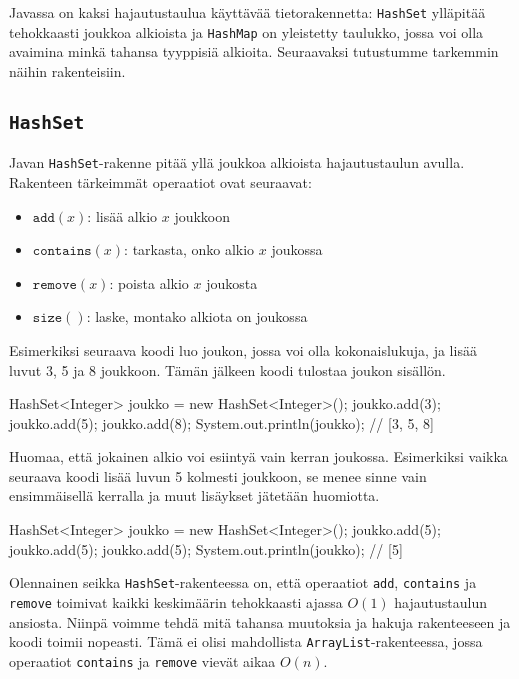 Javassa on kaksi hajautustaulua käyttävää tietorakennetta:
\texttt{HashSet} ylläpitää tehokkaasti joukkoa alkioista
ja \texttt{HashMap} on yleistetty taulukko,
jossa voi olla avaimina minkä tahansa tyyppisiä alkioita.
Seuraavaksi tutustumme tarkemmin näihin rakenteisiin.

\subsection{\texttt{HashSet}}

Javan \texttt{HashSet}-rakenne pitää yllä joukkoa alkioista
hajautustaulun avulla.
Rakenteen tärkeimmät operaatiot ovat seuraavat:

\begin{itemize}
\item $\texttt{add}(x)$: lisää alkio $x$ joukkoon
\item $\texttt{contains}(x)$: tarkasta, onko alkio $x$ joukossa
\item $\texttt{remove}(x)$: poista alkio $x$ joukosta
\item $\texttt{size}()$: laske, montako alkiota on joukossa
\end{itemize}

Esimerkiksi seuraava koodi luo joukon, jossa voi olla
kokonaislukuja, ja lisää luvut 3, 5 ja 8 joukkoon.
Tämän jälkeen koodi tulostaa joukon sisällön.

\begin{code}
HashSet<Integer> joukko = new HashSet<Integer>();
joukko.add(3);
joukko.add(5);
joukko.add(8);
System.out.println(joukko); // [3, 5, 8]
\end{code}

Huomaa, että jokainen alkio voi esiintyä vain kerran joukossa.
Esimerkiksi vaikka seuraava koodi lisää luvun 5 kolmesti
joukkoon, se menee sinne vain ensimmäisellä kerralla ja
muut lisäykset jätetään huomiotta.

\begin{code}
HashSet<Integer> joukko = new HashSet<Integer>();
joukko.add(5);
joukko.add(5);
joukko.add(5);
System.out.println(joukko); // [5]
\end{code}

Olennainen seikka \texttt{HashSet}-rakenteessa on,
että operaatiot \texttt{add}, \texttt{contains} ja \texttt{remove}
toimivat kaikki keskimäärin tehokkaasti ajassa $O(1)$
hajautustaulun ansiosta.
Niinpä voimme tehdä mitä tahansa muutoksia ja hakuja
rakenteeseen ja koodi toimii nopeasti.
Tämä ei olisi mahdollista \texttt{ArrayList}-rakenteessa,
jossa operaatiot \texttt{contains} ja \texttt{remove}
vievät aikaa $O(n)$.

